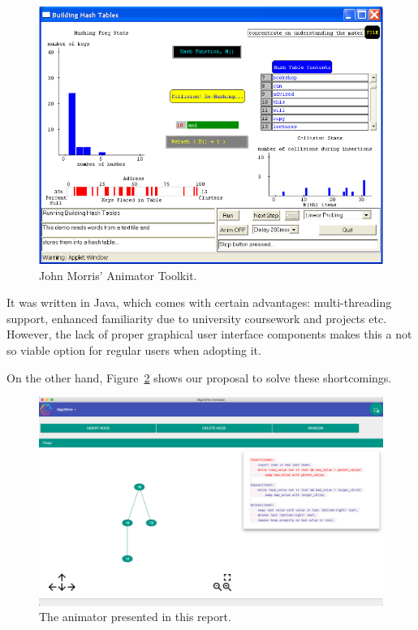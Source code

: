 \documentclass{l4proj}
\begin{document}
\begin{figure}[!ht]
\centering
\includegraphics[scale=0.8]{animator-toolkit}
\caption{John Morris' Animator Toolkit.}
\label{fig:animator-toolkit}
\end{figure}

It was written in Java, which comes with certain advantages: multi-threading support, enhanced familiarity due to
university coursework and projects etc. However, the lack of proper graphical user interface components makes this a
not so viable option for regular users when adopting it. 

On the other hand, Figure~\ref{fig:palgo} shows our proposal to solve these shortcomings.

\begin{figure}[!ht]
\centering
\includegraphics[scale=0.3]{algo-animator}
\caption{The animator presented in this report.}
\label{fig:palgo}
\end{figure}
\end{document}
